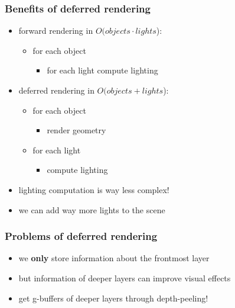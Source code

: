 \documentclass[aspectratio=169]{beamer}
\begin{document}
	\begin{frame}
		\frametitle{Benefits of deferred rendering}
		\begin{itemize}
			\item forward rendering in $O(objects \cdot lights$):
				\begin{itemize}
					\item for each object
						\begin{itemize}
							\item for each light compute lighting
						\end{itemize}
				\end{itemize}
			\item deferred rendering in $O(objects + lights$):
				\begin{itemize}
					\item for each object
						\begin{itemize}
							\item render geometry
						\end{itemize}
					\item for each light
						\begin{itemize}
							\item compute lighting
						\end{itemize}
				\end{itemize}
			\item lighting computation is way less complex!
			\item we can add way more lights to the scene
		\end{itemize}
	\end{frame}	

	\begin{frame}
		\frametitle{Problems of deferred rendering}
		\begin{itemize}
			\item we \textbf{only} store information about the frontmost layer
			\item but information of deeper layers can improve visual effects
			\item get g-buffers of deeper layers through depth-peeling!
		\end{itemize}
	\end{frame}	
\end{document}
